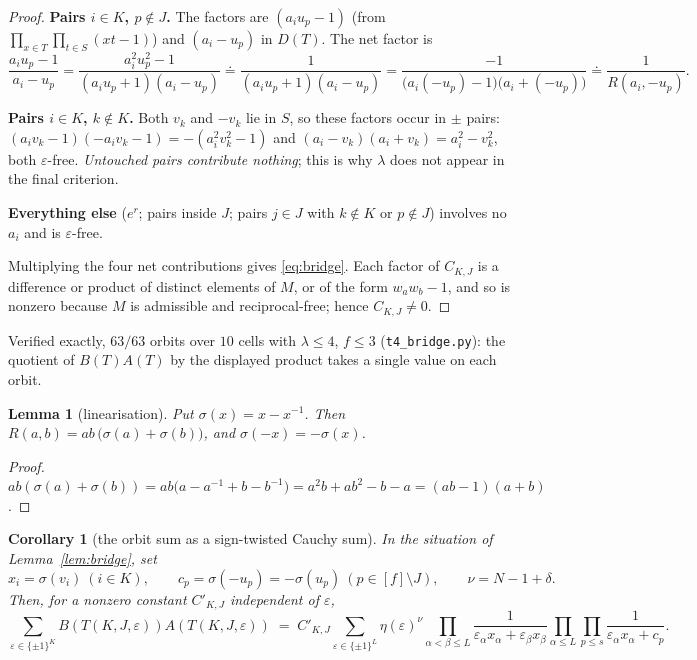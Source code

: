 \documentclass[11pt]{article}
\newtheorem{lemma}[theorem]{Lemma}
\newtheorem{corollary}[theorem]{Corollary}
\theoremstyle{definition}
\theoremstyle{remark}
\begin{document}
\begin{proof}
\smallskip\noindent\textbf{Pairs $i\in K$, $p\notin J$.} The factors are
$(a_iu_p-1)$ (from $\prod_{x\in T}\prod_{t\in S}(xt-1)$) and $(a_i-u_p)$ in $D(T)$.
The net factor is
\[
  \frac{a_iu_p-1}{a_i-u_p}=\frac{a_i^2u_p^2-1}{(a_iu_p+1)(a_i-u_p)}
  \doteq\frac{1}{(a_iu_p+1)(a_i-u_p)}
  =\frac{-1}{\bigl(a_i(-u_p)-1\bigr)\bigl(a_i+(-u_p)\bigr)}
  \doteq\frac{1}{R(a_i,-u_p)} .
\]

\smallskip\noindent\textbf{Pairs $i\in K$, $k\notin K$.} Both $v_k$ and $-v_k$ lie in
$S$, so these factors occur in $\pm$ pairs:
$(a_iv_k-1)(-a_iv_k-1)=-(a_i^2v_k^2-1)$ and $(a_i-v_k)(a_i+v_k)=a_i^2-v_k^2$, both
$\varepsilon$-free. \emph{Untouched pairs contribute nothing}; this is why $\lambda$ does
not appear in the final criterion.

\smallskip\noindent\textbf{Everything else} ($e^r$; pairs inside $J$; pairs
$j\in J$ with $k\notin K$ or $p\notin J$) involves no $a_i$ and is $\varepsilon$-free.

Multiplying the four net contributions gives \eqref{eq:bridge}. Each factor of
$C_{K,J}$ is a difference or product of distinct elements of $M$, or of the form
$w_aw_b-1$, and so is nonzero because $M$ is admissible and reciprocal-free; hence
$C_{K,J}\neq0$.
\end{proof}

Verified exactly, $63/63$ orbits over $10$ cells with $\lambda\le4$, $f\le3$
(\texttt{t4\_bridge.py}): the quotient of $B(T)A(T)$ by the displayed product takes a
single value on each orbit.

\begin{lemma}[linearisation]\label{lem:lin}
Put $\sigma(x)=x-x^{-1}$. Then $R(a,b)=ab\,\bigl(\sigma(a)+\sigma(b)\bigr)$, and
$\sigma(-x)=-\sigma(x)$.
\end{lemma}

\begin{proof}
$ab(\sigma(a)+\sigma(b))=ab\bigl(a-a^{-1}+b-b^{-1}\bigr)=a^2b+ab^2-b-a
 =(ab-1)(a+b)$.
\end{proof}

\begin{corollary}[the orbit sum as a sign-twisted Cauchy sum]\label{cor:orbitsum}
In the situation of Lemma~\ref{lem:bridge}, set
\[
  x_i=\sigma(v_i)\ (i\in K),\qquad c_p=\sigma(-u_p)=-\sigma(u_p)\ (p\in[f]\setminus J),
  \qquad \nu=N-1+\delta .
\]
Then, for a nonzero constant $C'_{K,J}$ independent of $\varepsilon$,
\begin{equation}\label{eq:orbitsum}
  \sum_{\varepsilon\in\{\pm1\}^{K}}\!\! B(T(K,J,\varepsilon))A(T(K,J,\varepsilon))
  \;=\;C'_{K,J}\!\!\sum_{\varepsilon\in\{\pm1\}^{L}}\!\!
     \eta(\varepsilon)^{\nu}
     \prod_{\alpha<\beta\le L}\!\frac{1}{\varepsilon_\alpha x_\alpha+\varepsilon_\beta x_\beta}
     \prod_{\alpha\le L}\prod_{p\le s}\!\frac{1}{\varepsilon_\alpha x_\alpha+c_p}.
\end{equation}
\end{corollary}
\end{document}

